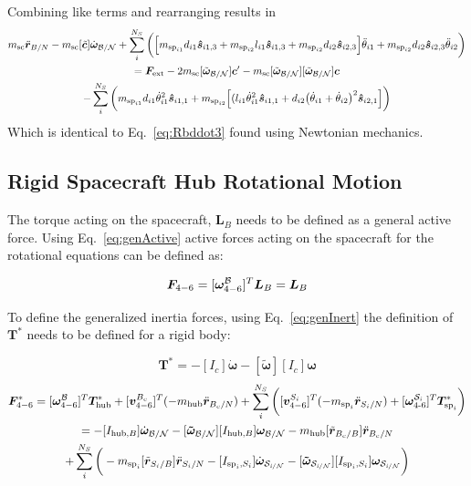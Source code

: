 \documentclass[paper]{aiaaNew}
\begin{document}
Combining like terms and rearranging results in
\begin{multline}
m_{\text{sc}} \ddot{\bm r}_{B/N} -m_{\textnormal{sc}} [\tilde{\bm{c}}]\dot{\bm\omega}_{\cal B/N} 
+ \sum\limits_{i}^{N_S} \bigg( \Big[m_{\text{sp}_{i1}} d_{i1} \bm{\hat{s}}_{i1,3} + m_{\text{sp}_{i2}} l_{i1} \bm{\hat{s}}_{i1,3} +m_{\text{sp}_{i2}} d_{i2} \bm{\hat{s}}_{i2,3}\Big] \ddot{\theta}_{i1} 
+ m_{\text{sp}_{i2}}d_{i2} \bm{\hat{s}}_{i2,3} \ddot{\theta}_{i2} \bigg) \\
= \bm F_{\text{ext}} - 2 m_{\textnormal{sc}}[\tilde{\bm\omega}_{\cal B/N}]\bm{c}' - m_{\textnormal{sc}} [\tilde{\bm\omega}_{\cal B/N}][\tilde{\bm\omega}_{\cal B/N}]\bm{c} \\- \sum\limits_{i}^{N_S} \bigg( m_{\text{sp}_{i1}} d_{i1} \dot{\theta}_{i1}^2 \bm{\hat{s}}_{i1,1} + m_{\text{sp}_{i2}} \Big[(l_{i1} \dot{\theta}_{i1}^2 \bm{\hat{s}}_{i1,1} + d_{i2}\big(\dot{\theta}_{i1} + \dot{\theta}_{i2}\big)^2\bm{\hat{s}}_{i2,1} \Big]\bigg)
\end{multline}
Which is identical to Eq.~\eqref{eq:Rbddot3} found using Newtonian mechanics.
\subsection{Rigid Spacecraft Hub Rotational Motion}

The torque acting on the spacecraft, $\bm L_B$ needs to be defined as a general active force. Using Eq.~\eqref{eq:genActive} active forces acting on the spacecraft for the rotational equations can be defined as:

\begin{equation}
\bm F_{4-6} = [\bm \omega_{4-6}^{\cal{B}}]^T \bm L_B = \bm L_B
\end{equation}

To define the generalized inertia forces, using Eq.~\eqref{eq:genInert} the definition of $\bm T^*$ needs to be defined for a rigid body:

\begin{equation}
\bm T^* = -[I_c] \dot{\bm\omega}  -[\bm{\tilde{\omega}}] [I_c] \bm\omega
\end{equation}
\begin{multline}
\bm F^*_{4-6} = [\bm \omega_{4-6}^{\cal{B}}]^T \bm T^*_{\text{hub}} + [\bm v^{B_c}_{4-6}]^T (-m_{\text{hub}} \ddot{\bm r}_{B_c/N}) + \sum\limits_{i}^{N_S}\bigg([\bm v^{S_i}_{4-6}]^T (-m_{\text{sp}_i} \ddot{\bm r}_{S_{i}/N}) + [\bm \omega_{\text{4-6}}^{\cal{S}_\textit{i}}]^T \bm T^*_{\text{sp}_i}\bigg) \\
= -[I_{\text{hub},B}] \dot{\bm\omega}_{\cal B/N}  -[\bm{\tilde{\omega}}_{\cal B/N}] [I_{\text{hub},B}] \bm\omega_{\cal B/N} - m_{\text{hub}} [\tilde{{\bm r}}_{B_c/B}] \ddot{\bm r}_{B_c/N} \\
+ \sum\limits_{i}^{N_S}\bigg(- m_{\text{sp}_i} [\tilde{{\bm r}}_{S_{i}/B}] \ddot{\bm r}_{S_{i}/N} -[I_{\text{sp}_i,S_i}] \dot{\bm\omega}_{\cal S_{\textit{i}/N}}  -[\bm{\tilde{\omega}}_{\cal S_{\textit{i}/N}}] [I_{\text{sp}_i,S_i}] \bm\omega_{\cal S_{\textit{i}/N}}\bigg)
\end{multline}
\end{document}
